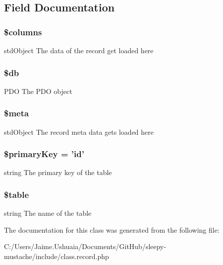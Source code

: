 \subsection{Field Documentation}
\hypertarget{class_record_a19d2a3d21fe02053311fde465e6ae2e9}{
\subsubsection[{\$columns}]{\setlength{\rightskip}{0pt plus 5cm}\$columns}}\label{class_record_a19d2a3d21fe02053311fde465e6ae2e9}
std\-Object The data of the record get loaded here \hypertarget{class_record_a1fa3127fc82f96b1436d871ef02be319}{
\subsubsection[{\$db}]{\setlength{\rightskip}{0pt plus 5cm}\$db\hspace{0.3cm}{\ttfamily [protected]}}}\label{class_record_a1fa3127fc82f96b1436d871ef02be319}
P\-D\-O The P\-D\-O object \hypertarget{class_record_a9e6fc1ae0498be7d1e682f8bcc9299df}{
\subsubsection[{\$meta}]{\setlength{\rightskip}{0pt plus 5cm}\$meta}}\label{class_record_a9e6fc1ae0498be7d1e682f8bcc9299df}
std\-Object The record meta data gets loaded here \hypertarget{class_record_a927b0256b942a3ee89485f2649af7981}{
\subsubsection[{\$primary\-Key}]{\setlength{\rightskip}{0pt plus 5cm}\$primary\-Key = 'id'\hspace{0.3cm}{\ttfamily [protected]}}}\label{class_record_a927b0256b942a3ee89485f2649af7981}
string The primary key of the table \hypertarget{class_record_ae8876a14058f368335baccf35af4a22b}{
\subsubsection[{\$table}]{\setlength{\rightskip}{0pt plus 5cm}\$table\hspace{0.3cm}{\ttfamily [protected]}}}\label{class_record_ae8876a14058f368335baccf35af4a22b}
string The name of the table 

The documentation for this class was generated from the following file\-:\begin{DoxyCompactItemize}
\item 
C\-:/\-Users/\-Jaime.\-Ushuaia/\-Documents/\-Git\-Hub/sleepy-\/mustache/include/class.\-record.\-php\end{DoxyCompactItemize}
